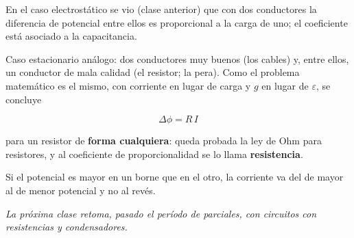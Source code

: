 \documentclass[12pt,a4paper]{article}
\begin{document}
En el caso electrostático se vio (clase anterior) que con dos conductores la
diferencia de potencial entre ellos es proporcional a la carga de uno; el
coeficiente está asociado a la capacitancia.

Caso estacionario análogo: dos conductores muy buenos (los cables) y, entre
ellos, un conductor de mala calidad (el resistor; la pera). Como el problema
matemático es el mismo, con corriente en lugar de carga y $g$ en lugar de
$\varepsilon$, se concluye

\begin{keybox}
\[
\boxed{\ \Delta\phi = R\,I\ }
\]
\end{keybox}
para un resistor de \textbf{forma cualquiera}: queda probada la ley de Ohm para
resistores, y al coeficiente de proporcionalidad se lo llama \textbf{resistencia}.

\begin{notebox}[$R$ es positiva]
Si el potencial es mayor en un borne que en el otro, la
corriente va del de mayor al de menor potencial y no al revés.
\end{notebox}

\noindent\emph{La próxima clase retoma, pasado el período de parciales, con circuitos con
resistencias y condensadores.}
\end{document}
